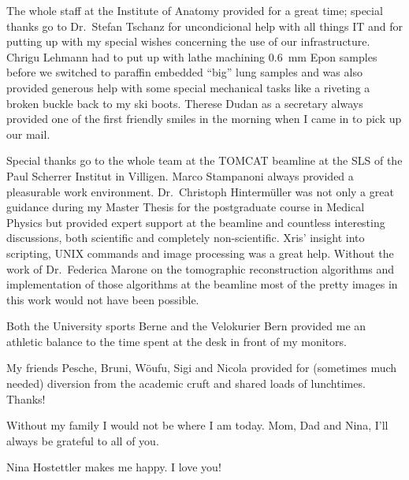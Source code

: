 The whole staff at the Institute of Anatomy provided for a great time; special thanks go to Dr.\ Stefan Tschanz for uncondicional help with all things IT and for putting up with my special wishes concerning the use of our infrastructure. Chrigu Lehmann had to put up with lathe machining \SI{0.6}{\milli\meter} Epon samples before we switched to paraffin embedded ``big'' lung samples and was also provided generous help with some special mechanical tasks like a riveting a broken buckle back to my ski boots. Therese Dudan as a secretary always provided one of the first friendly smiles in the morning when I came in to pick up our mail.

Special thanks go to the whole team at the \acs{TOMCAT} beamline at the \acl{SLS} of the Paul Scherrer Institut in Villigen. Marco Stampanoni always provided a pleasurable work environment. Dr.\ Christoph Hintermüller was not only a great guidance during my Master Thesis for the postgraduate course in Medical Physics but provided expert support at the beamline and countless interesting discussions, both scientific and completely non-scientific. Xris' insight into scripting, UNIX commands and image processing was a great help. Without the work of Dr.\ Federica Marone on the tomographic reconstruction algorithms and implementation of those algorithms at the beamline most of the pretty images in this work would not have been possible.

Both the University sports Berne and the Velokurier Bern provided me an athletic balance to the time spent at the desk in front of my monitors.

My friends Pesche, Bruni, Wöufu, Sigi and Nicola provided for (sometimes much needed) diversion from the academic cruft and shared loads of lunchtimes. Thanks!

Without my family I would not be where I am today. Mom, Dad and Nina, I'll always
be grateful to all of you.

Nina  Hostettler makes me happy. I love you!
\endgroup